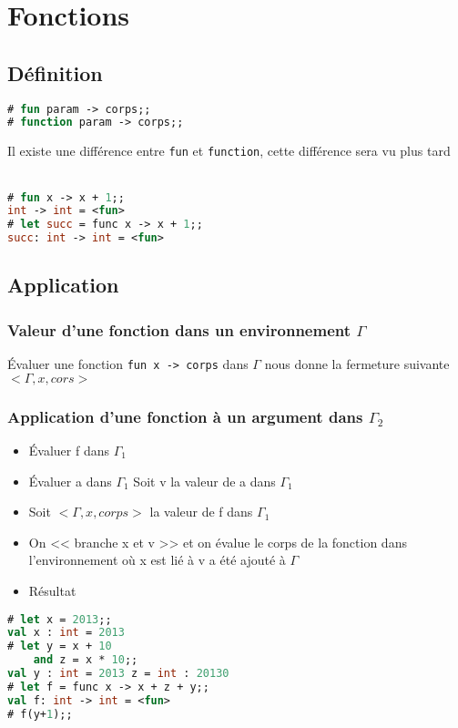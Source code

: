 \documentclass[12pt,a4paper,openany]{book}
\begin{document}
\section{Fonctions}
\subsection{Définition}
	\begin{lstlisting}[language=Caml, caption=Sytaxe d'une définition de fonction]
# fun param -> corps;;		
# function param -> corps;;
\end{lstlisting}
		\begin{remarque}{Il existe une différence entre \texttt{fun} et \texttt{function}, cette différence sera vu plus tard}\\~\end{remarque}
			\begin{exemple}
	\begin{lstlisting}[language=Caml, caption=Sytaxe d'une définition de fonction, numbers=none, framerule=0pt]
# fun x -> x + 1;;		
int -> int = <fun>
# let succ = func x -> x + 1;; 
succ: int -> int = <fun>
\end{lstlisting}
				\end{exemple}
				\subsection{Application}
				\subsubsection{Valeur d'une fonction dans un environnement $\Gamma$}
				Évaluer une fonction \texttt{fun x -> corps} dans $\Gamma$ nous donne la fermeture suivante $<\Gamma, x, cors>$
				\subsubsection{Application d'une fonction à un argument dans $\Gamma_2$}
				\begin{itemize}
					\item Évaluer f dans $\Gamma_1$
					\item Évaluer a dans $\Gamma_1$ Soit v la valeur de a dans $\Gamma_1$
					\item Soit $<\Gamma, x, corps>$ la valeur de f dans $\Gamma_1$
					\item On << branche x et v >> et on évalue le corps de la fonction dans l'environnement où x est lié à v a été ajouté à $\Gamma$
					\item Résultat
				\end{itemize}
			\begin{exemple}
	\begin{lstlisting}[language=Caml, caption=Exemple d'utilisation de fonctions, numbers=none]
# let x = 2013;;
val x : int = 2013
# let y = x + 10
	and z = x * 10;;
val y : int = 2013 z = int : 20130
# let f = func x -> x + z + y;;
val f: int -> int = <fun>
# f(y+1);;
\end{lstlisting}
			\end{exemple}
\end{document}
